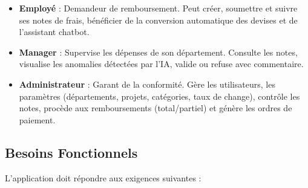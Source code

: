 \documentclass[12pt,a4paper]{report}
\begin{document}
\begin{itemize}

\item \textbf{Employé} : Demandeur de remboursement. Peut créer, soumettre et suivre ses notes de frais, bénéficier de la conversion automatique des devises et de l'assistant chatbot.



\item \textbf{Manager} : Supervise les dépenses de son département. Consulte les notes, visualise les anomalies détectées par l'IA, valide ou refuse avec commentaire.



\item \textbf{Administrateur} : Garant de la conformité. Gère les utilisateurs, les paramètres (départements, projets, catégories, taux de change), contrôle les notes, procède aux remboursements (total/partiel) et génère les ordres de paiement.

\end{itemize}

\subsection{Besoins Fonctionnels}

L'application doit répondre aux exigences suivantes :
\end{document}
